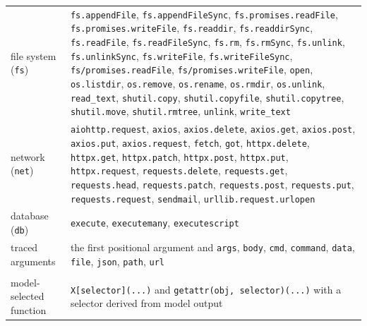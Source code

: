 {\begin{longtable}{@{}>{\raggedright\arraybackslash}p{}>{\raggedright\arraybackslash}p{}@{}}
file system (\texttt{fs}) & \texttt{fs.appendFile}, \texttt{fs.appendFileSync}, \texttt{fs.promises.readFile}, \texttt{fs.promises.writeFile}, \texttt{fs.readdir}, \texttt{fs.readdirSync}, \texttt{fs.readFile}, \texttt{fs.readFileSync}, \texttt{fs.rm}, \texttt{fs.rmSync}, \texttt{fs.unlink}, \texttt{fs.unlinkSync}, \texttt{fs.writeFile}, \texttt{fs.writeFileSync}, \texttt{fs/promises.readFile}, \texttt{fs/promises.writeFile}, \texttt{open}, \texttt{os.listdir}, \texttt{os.remove}, \texttt{os.rename}, \texttt{os.rmdir}, \texttt{os.unlink}, \texttt{read\_text}, \texttt{shutil.copy}, \texttt{shutil.copyfile}, \texttt{shutil.copytree}, \texttt{shutil.move}, \texttt{shutil.rmtree}, \texttt{unlink}, \texttt{write\_text} \\
network (\texttt{net}) & \texttt{aiohttp.request}, \texttt{axios}, \texttt{axios.delete}, \texttt{axios.get}, \texttt{axios.post}, \texttt{axios.put}, \texttt{axios.request}, \texttt{fetch}, \texttt{got}, \texttt{httpx.delete}, \texttt{httpx.get}, \texttt{httpx.patch}, \texttt{httpx.post}, \texttt{httpx.put}, \texttt{httpx.request}, \texttt{requests.delete}, \texttt{requests.get}, \texttt{requests.head}, \texttt{requests.patch}, \texttt{requests.post}, \texttt{requests.put}, \texttt{requests.request}, \texttt{sendmail}, \texttt{urllib.request.urlopen} \\
database (\texttt{db}) & \texttt{execute}, \texttt{executemany}, \texttt{executescript} \\
traced arguments & the first positional argument and \texttt{args}, \texttt{body}, \texttt{cmd}, \texttt{command}, \texttt{data}, \texttt{file}, \texttt{json}, \texttt{path}, \texttt{url} \\
\addlinespace[3pt]\multicolumn{2}{@{}l}{\emph{dispatch}} \\
model-selected function & \texttt{X[selector](...)} and \texttt{getattr(obj, selector)(...)} with a selector derived from model output \\
\end{longtable}

}
